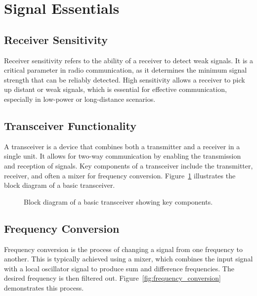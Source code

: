 \section{Signal Essentials}
\label{section:signal_essentials}

\subsection*{Receiver Sensitivity}
Receiver sensitivity refers to the ability of a receiver to detect weak signals. It is a critical parameter in radio communication, as it determines the minimum signal strength that can be reliably detected. High sensitivity allows a receiver to pick up distant or weak signals, which is essential for effective communication, especially in low-power or long-distance scenarios.

\subsection*{Transceiver Functionality}
A transceiver is a device that combines both a transmitter and a receiver in a single unit. It allows for two-way communication by enabling the transmission and reception of signals. Key components of a transceiver include the transmitter, receiver, and often a mixer for frequency conversion. Figure~\ref{fig:transceiver_block_diagram} illustrates the block diagram of a basic transceiver.

\begin{figure}[h!]
    \centering
    \caption{Block diagram of a basic transceiver showing key components.}
    \label{fig:transceiver_block_diagram}
\end{figure}

\subsection*{Frequency Conversion}
Frequency conversion is the process of changing a signal from one frequency to another. This is typically achieved using a mixer, which combines the input signal with a local oscillator signal to produce sum and difference frequencies. The desired frequency is then filtered out. Figure~\ref{fig:frequency_conversion} demonstrates this process.

